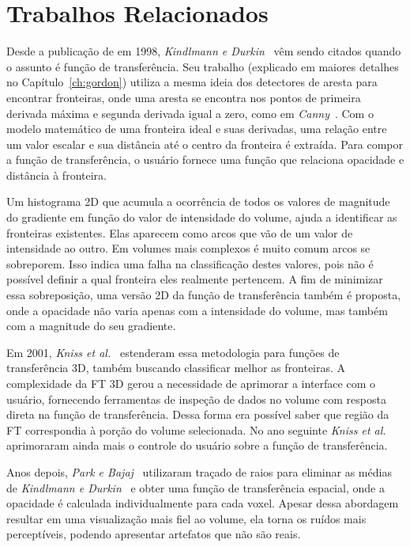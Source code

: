 
\chapter{Trabalhos Relacionados}
\label{ch:related}
	Desde a publicação de  em 1998, \textit{Kindlmann e Durkin}~\cite{gordon} vêm sendo citados quando o assunto é função de transferência. Seu trabalho (explicado em maiores detalhes no Capítulo~\ref{ch:gordon}) utiliza a mesma ideia dos detectores de aresta para encontrar fronteiras, onde uma aresta se encontra nos pontos de primeira derivada máxima e segunda derivada igual a zero, como em \textit{Canny}~\cite{canny}. Com o modelo matemático de uma fronteira ideal e suas derivadas, uma relação entre um valor escalar e sua distância até o centro da fronteira é extraída. Para compor a função de transferência, o usuário fornece uma função que relaciona opacidade e distância à fronteira. 
	
	Um histograma 2D que acumula a ocorrência de todos os valores de magnitude do gradiente em função do valor de intensidade do volume, ajuda a identificar as fronteiras existentes. Elas aparecem como arcos que vão de um valor de intensidade ao outro. Em volumes mais complexos é muito comum arcos se sobreporem. Isso indica uma falha na classificação destes valores, pois não é possível definir a qual fronteira eles realmente pertencem. A fim de minimizar essa sobreposição, uma versão 2D da função de transferência também é proposta, onde a opacidade não varia apenas com a intensidade do volume, mas também com a magnitude do seu gradiente.
	
	Em 2001, \textit{Kniss et al.}~\cite{kniss1} estenderam essa metodologia para funções de transferência 3D, também buscando classificar melhor as fronteiras. A complexidade da FT 3D gerou a necessidade de aprimorar a interface com o usuário, fornecendo ferramentas de inspeção de dados no volume com resposta direta na função de transferência. Dessa forma era possível saber que região da FT correspondia à porção do volume selecionada. No ano seguinte \textit{Kniss et al.}~\cite{kniss2} aprimoraram ainda mais o controle do usuário sobre a função de transferência.
	
	Anos depois, \textit{Park e Bajaj}~\cite{park} utilizaram traçado de raios para eliminar as médias de \textit{Kindlmann e Durkin}~\cite{gordon} e obter uma função de transferência espacial, onde a opacidade é calculada individualmente para cada voxel. Apesar dessa abordagem resultar em uma visualização mais fiel ao volume, ela torna os ruídos mais perceptíveis, podendo apresentar artefatos que não são reais.
	
